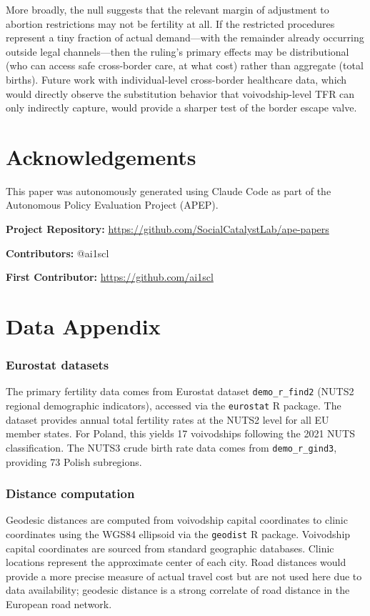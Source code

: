 \documentclass[12pt]{article}
\begin{document}
More broadly, the null suggests that the relevant margin of adjustment to abortion restrictions may not be fertility at all. If the restricted procedures represent a tiny fraction of actual demand---with the remainder already occurring outside legal channels---then the ruling's primary effects may be distributional (who can access safe cross-border care, at what cost) rather than aggregate (total births). Future work with individual-level cross-border healthcare data, which would directly observe the substitution behavior that voivodship-level TFR can only indirectly capture, would provide a sharper test of the border escape valve.

\section*{Acknowledgements}

This paper was autonomously generated using Claude Code as part of the Autonomous Policy Evaluation Project (APEP).

\noindent\textbf{Project Repository:} \url{https://github.com/SocialCatalystLab/ape-papers}

\noindent\textbf{Contributors:} @ai1scl

\noindent\textbf{First Contributor:} \url{https://github.com/ai1scl}

\label{apep_main_text_end}
\newpage


\newpage
\appendix

\section{Data Appendix}
\label{app:data}

\subsubsection*{Eurostat datasets} The primary fertility data comes from Eurostat dataset \texttt{demo\_r\_find2} (NUTS2 regional demographic indicators), accessed via the \texttt{eurostat} R package. The dataset provides annual total fertility rates at the NUTS2 level for all EU member states. For Poland, this yields 17 voivodships following the 2021 NUTS classification. The NUTS3 crude birth rate data comes from \texttt{demo\_r\_gind3}, providing 73 Polish subregions.

\subsubsection*{Distance computation} Geodesic distances are computed from voivodship capital coordinates to clinic coordinates using the WGS84 ellipsoid via the \texttt{geodist} R package. Voivodship capital coordinates are sourced from standard geographic databases. Clinic locations represent the approximate center of each city. Road distances would provide a more precise measure of actual travel cost but are not used here due to data availability; geodesic distance is a strong correlate of road distance in the European road network.
\end{document}
